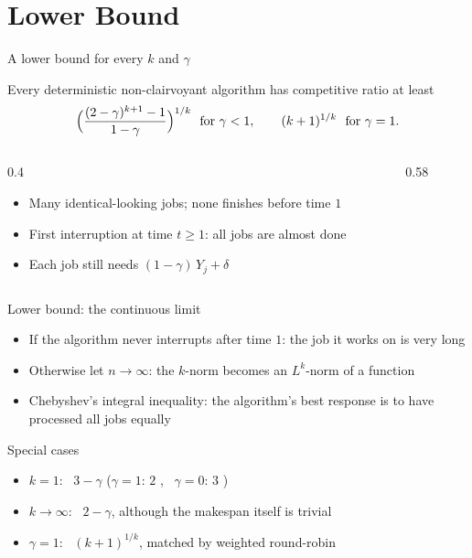 \documentclass[aspectratio=169,11pt]{beamer}
\newcommand{\src}[2][]{{\footnotesize\color{ztgray}%
  \if\relax\detokenize{#1}\relax\cite{#2}\else\cite[#1]{#2}\fi}}
\begin{document}
\section{Lower Bound}

\begin{frame}{A lower bound for every $k$ and $\gamma$}
  \begin{theorem}
    Every deterministic non-clairvoyant algorithm has competitive ratio at least
    \[ \Bigl(\frac{(2-\gamma)^{k+1}-1}{1-\gamma}\Bigr)^{1/k} \ \text{ for } \gamma < 1,
       \qquad (k+1)^{1/k} \ \text{ for } \gamma = 1 . \]
  \end{theorem}
  \begin{columns}[c]
    \begin{column}{0.4\textwidth}
      \begin{itemize}
        \item Many identical-looking jobs; none finishes before time $1$
        \item First interruption at time $t \ge 1$:
              all jobs are \alert{almost} done
        \item Each job still needs $(1-\gamma)\,Y_j + \delta$
      \end{itemize}
    \end{column}
    \begin{column}{0.58\textwidth}
      \centering
      
    \end{column}
  \end{columns}
\end{frame}

\begin{frame}{Lower bound: the continuous limit}
  \begin{itemize}
    \item If the algorithm never interrupts after time $1$: the job it works on is very long
    \item Otherwise let $n \to \infty$: the $k$-norm becomes an $L^k$-norm of a function
    \item Chebyshev's integral inequality: the algorithm's best response is to have
          processed \alert{all jobs equally}
  \end{itemize}
  \vfill
  \begin{block}{Special cases}
    \begin{itemize}
      \item $k = 1$: \ $3 - \gamma$ \quad
            ($\gamma = 1$: $2$ \src{mpt94}, \ $\gamma = 0$: $3$ \src{jssw25})
      \item $k \to \infty$: \ $2 - \gamma$, although the makespan itself is trivial
      \item $\gamma = 1$: \ $(k+1)^{1/k}$, matched by weighted round-robin
    \end{itemize}
  \end{block}
\end{frame}
\end{document}
